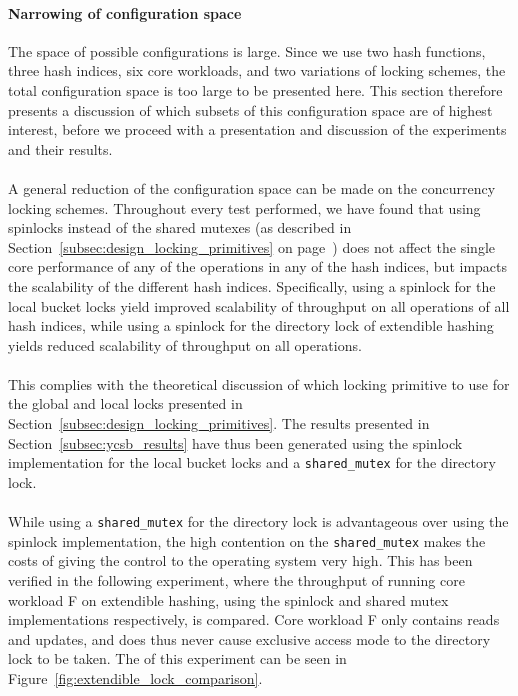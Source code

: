 \documentclass[11pt]{report} %
\begin{document}
\paragraph{Narrowing of configuration space}
The space of possible configurations is large. Since we use two hash functions, three hash indices, six core workloads, and two variations of locking schemes, the total configuration space is too large to be presented here. This section therefore presents a discussion of which subsets of this configuration space are of highest interest, before we proceed with a presentation and discussion of the experiments and their results.\\
\\
A general reduction of the configuration space can be made on the concurrency locking schemes. Throughout every test performed, we have found that using spinlocks instead of the shared mutexes (as described in Section~\ref{subsec:design_locking_primitives} on page~\pageref{subsec:design_locking_primitives}) does not affect the single core performance of any of the operations in any of the hash indices, but impacts the scalability of the different hash indices. Specifically, using a spinlock for the local bucket locks yield improved scalability of throughput on all operations of all hash indices, while using a spinlock for the directory lock of extendible hashing yields reduced scalability of throughput on all operations. \\
\\
This complies with the theoretical discussion of which locking primitive to use for the global and local locks presented in Section~\ref{subsec:design_locking_primitives}. The results presented in Section~\ref{subsec:ycsb_results} have thus been generated using the spinlock implementation for the local bucket locks and a \verb|shared_mutex| for the directory lock.\\
\\
While using a \verb|shared_mutex| for the directory lock is advantageous over using the spinlock implementation, the high contention on the \verb|shared_mutex| makes the costs of giving the control to the operating system very high. This has been verified in the following experiment, where the throughput of running core workload F on extendible hashing, using the spinlock and shared mutex implementations respectively, is compared. Core workload F only contains reads and updates, and does thus never cause exclusive access mode to the directory lock to be taken. The of this experiment can be seen in Figure~\ref{fig:extendible_lock_comparison}.
\end{document}
